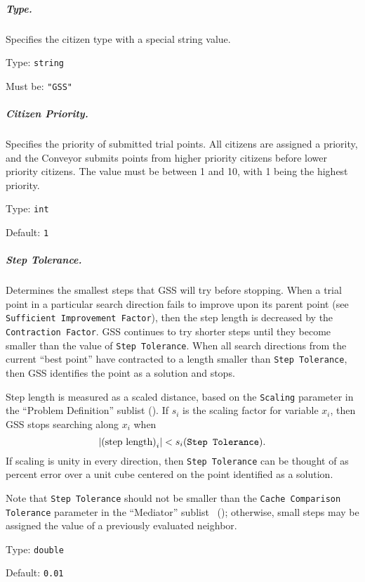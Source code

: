 \subparagraph{Type.}  \label{param:GS-type}
Specifies the citizen type with a special string value.

\hspace{0.2in}
Type: {\tt string}

\hspace{0.2in}
Must be: {\tt "GSS"}

\subparagraph{Citizen Priority.}  \label{param:GS-priority}
Specifies the priority of submitted trial points.  All citizens
are assigned a priority, and the Conveyor submits points from higher priority
citizens before lower priority citizens.  The value must be between 1 and 10,
with 1 being the highest priority.

\hspace{0.2in}
Type: {\tt int}

\hspace{0.2in}
Default: {\tt 1}

\subparagraph{Step Tolerance.}  \label{param:GS-steptol}
Determines the smallest steps that GSS will try before stopping.
When a trial point in a particular search direction fails to improve upon
its parent point (see {\tt Sufficient Improvement Factor}), then the step
length is decreased by the {\tt Contraction Factor}.  GSS continues to try
shorter steps until they become smaller than the value of {\tt Step Tolerance}.
When all search directions from the current ``best point'' have contracted
to a length smaller than {\tt Step Tolerance}, then GSS identifies the point
as a solution and stops.

\noindent
Step length is measured as a scaled distance, based on the {\tt Scaling}
parameter in the ``Problem Definition'' sublist ().
If $s_i$ is the scaling factor for variable $x_i$, then GSS stops searching
along $x_i$ when
\[
    | \mbox{(step length)}_i | < s_i (\mbox{\tt Step Tolerance}) .
\]
If scaling is unity in every direction, then {\tt Step Tolerance} can be
thought of as percent error over a unit cube centered on the point identified
as a solution.

\noindent
Note that {\tt Step Tolerance} should not be smaller than the
{\tt Cache Comparison Tolerance} parameter in the ``Mediator'' sublist
~(); otherwise, small steps may be assigned the
value of a previously evaluated neighbor.

\hspace{0.2in}
Type: {\tt double}

\hspace{0.2in}
Default: {\tt 0.01}

